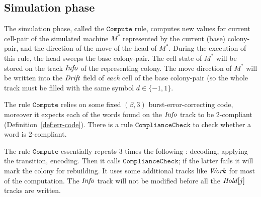 \documentclass[11pt]{memoir}
\theoremstyle{definition} %
\newcommand{\fld}[1]{\ensuremath{\textit{#1\/}}}
\newcommand{\rul}[1]{\ensuremath{\texttt{#1}}}
\newcommand{\Drift}{\fld{Drift}}
\newcommand{\Hold}{\fld{Hold}}
\newcommand{\Info}{\fld{Info}}
\newcommand{\Work}{\fld{Work}} %
\newcommand{\Comp}{\rul{Compute}}
\begin{document}
\subsection{Simulation phase}\label{sec:simulation-phase}

The simulation phase, called the \( \Comp \) rule,
computes new values for current cell-pair of the
simulated machine \( M^{*} \) represented by the current (base) colony-pair,
and the direction of the move of the head of  \( M^{*} \).
During the execution of this rule, the head sweeps the base colony-pair.  
The cell state of \( M^{*} \) will be stored on the track \( \Info \) of the
representing colony.
The move direction of \( M^{*} \) 
will be written into the \( \Drift \) field of \emph{each} cell of the base colony-pair
(so the whole track must be filled with the same symbol \( d\in\{-1,1\} \).

The rule \( \Comp \) relies on some fixed \( (\beta,3) \) burst-error-correcting
code, moreover it expects each of the words found on the \( \Info \) track to be
2-compliant (Definition~\ref{def:err-code}).  %
There is a rule \( \rul{ComplianceCheck} \) to check whether a word is \( 2 \)-compliant.

The rule \( \Comp \) essentially repeats 3 times %
the following : decoding, applying the transition, encoding.
Then it calls \( \rul{ComplianceCheck} \); if the latter fails
it will mark the colony for rebuilding.
It uses some additional tracks like \( \Work \) for most of the computation.
 The \( \Info \) track will not be modified before all the \( \Hold[j] \) tracks are written.
\end{document}
